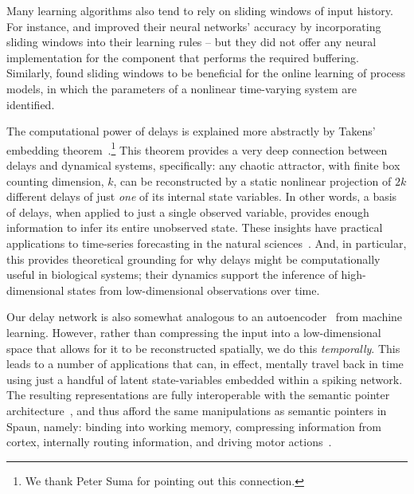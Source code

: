 Many learning algorithms also tend to rely on sliding windows of input history.
For instance, \citet{leng2013online} and \citet{izzeldin2011online} improved their neural networks' accuracy by incorporating sliding windows into their learning rules -- but they did not offer any neural implementation for the component that performs the required buffering.
Similarly, \citet{ferreira2009online} found sliding windows to be beneficial for the online learning of process models, in which the parameters of a nonlinear time-varying system are identified.

The computational power of delays is explained more abstractly by Takens' embedding theorem~\citep{takens1981detecting, noakes1991takens}.\footnote{%
We thank Peter Suma for pointing out this connection.
}
This theorem provides a very deep connection between delays and dynamical systems, specifically: any chaotic attractor, with finite box counting dimension, $k$, can be reconstructed by a static nonlinear projection of $2k$ different delays of just \emph{one} of its internal state variables.
In other words, a basis of delays, when applied to just a single observed variable, provides enough information to infer its entire unobserved state.
These insights have practical applications to time-series forecasting in the natural sciences~\citep{sugihara2012detecting}.
And, in particular, this provides theoretical grounding for why delays might be computationally useful in biological systems; their dynamics support the inference of high-dimensional states from low-dimensional observations over time.

Our delay network is also somewhat analogous to an autoencoder~\citep{gulli2017deep} from machine learning.
However, rather than compressing the input into a low-dimensional space that allows for it to be reconstructed spatially, we do this \emph{temporally}.
This leads to a number of applications that can, in effect, mentally travel back in time using just a handful of latent state-variables embedded within a spiking network.
The resulting representations are fully interoperable with the semantic pointer architecture~\citep[SPA;][]{eliasmith2012}, and thus afford the same manipulations as semantic pointers in Spaun, namely: binding into working memory, compressing information from cortex, internally routing information, and driving motor actions~\citep{eliasmith2013build}.


